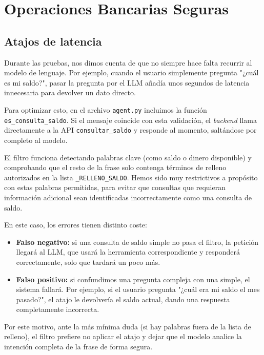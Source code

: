 \newpage
\section{Operaciones Bancarias Seguras}

\subsection{Atajos de latencia}

Durante las pruebas, nos dimos cuenta de que no siempre hace falta recurrir al 
modelo de lenguaje. Por ejemplo, cuando el usuario simplemente pregunta 
"¿cuál es mi saldo?", pasar la pregunta por el LLM añadía unos segundos de 
latencia innecesaria para devolver un dato directo.

Para optimizar esto, en el archivo \texttt{agent.py} incluimos la función 
\texttt{es\_consulta\_saldo}. Si el mensaje coincide con esta validación, 
el \emph{backend} llama directamente a la API \texttt{consultar\_saldo} y 
responde al momento, saltándose por completo al modelo.

El filtro funciona detectando palabras clave (como saldo o dinero disponible) 
y comprobando que el resto de la frase solo contenga términos de relleno autorizados 
en la lista \texttt{\_RELLENO\_SALDO}. Hemos sido muy restrictivos a propósito con estas 
palabras permitidas, para evitar que consultas que requieran información adicional 
sean identificadas incorrectamente como una consulta de saldo.

En este caso, los errores tienen distinto coste:
\begin{itemize}
    \item \textbf{Falso negativo:} si una consulta de saldo simple no pasa el filtro, 
    la petición llegará al LLM, que usará la herramienta correspondiente y responderá 
    correctamente, solo que tardará un poco más.

    \item \textbf{Falso positivo:} si confundimos una pregunta compleja con una simple, 
    el sistema fallará. Por ejemplo, si el usuario pregunta "¿cuál era mi saldo el mes 
    pasado?", el atajo le devolvería el saldo actual, dando una respuesta completamente 
    incorrecta.
\end{itemize}

Por este motivo, ante la más mínima duda (si hay palabras fuera de la lista de relleno), 
el filtro prefiere no aplicar el atajo y dejar que el modelo analice la intención completa 
de la frase de forma segura.

